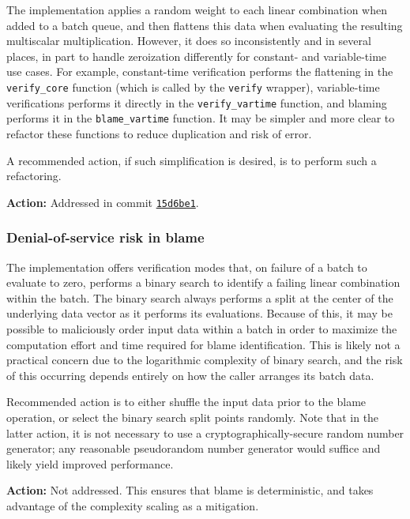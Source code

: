 \documentclass{article}
\begin{document}
The implementation applies a random weight to each linear combination when added to a batch queue, and then flattens this data when evaluating the resulting multiscalar multiplication.
However, it does so inconsistently and in several places, in part to handle zeroization differently for constant- and variable-time use cases.
For example, constant-time verification performs the flattening in the \texttt{verify\_core} function (which is called by the \texttt{verify} wrapper), variable-time verifications performs it directly in the \texttt{verify\_vartime} function, and blaming performs it in the \texttt{blame\_vartime} function.
It may be simpler and more clear to refactor these functions to reduce duplication and risk of error.

A recommended action, if such simplification is desired, is to perform such a refactoring.

\textbf{Action:} Addressed in commit \href{https://github.com/serai-dex/serai/commit/15d6be16783064a3e94780e1fd79861534c6aef8}{\texttt{15d6be1}}.


\subsubsection{Denial-of-service risk in blame}

The implementation offers verification modes that, on failure of a batch to evaluate to zero, performs a binary search to identify a failing linear combination within the batch.
The binary search always performs a split at the center of the underlying data vector as it performs its evaluations.
Because of this, it may be possible to maliciously order input data within a batch in order to maximize the computation effort and time required for blame identification.
This is likely not a practical concern due to the logarithmic complexity of binary search, and the risk of this occurring depends entirely on how the caller arranges its batch data.

Recommended action is to either shuffle the input data prior to the blame operation, or select the binary search split points randomly.
Note that in the latter action, it is not necessary to use a cryptographically-secure random number generator; any reasonable pseudorandom number generator would suffice and likely yield improved performance.

\textbf{Action:} Not addressed. This ensures that blame is deterministic, and takes advantage of the complexity scaling as a mitigation.
\end{document}
